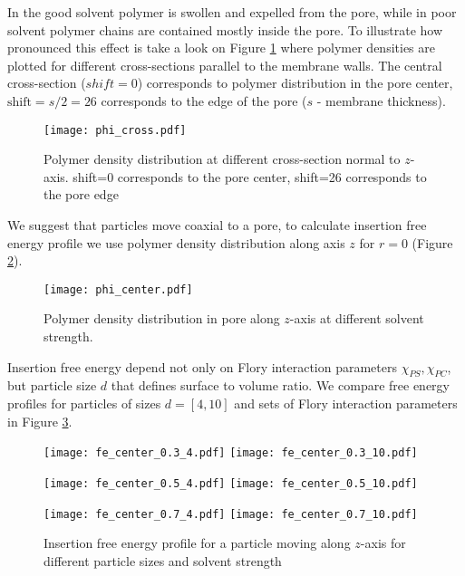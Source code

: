 \documentclass[12pt,a4paper]{article}
\begin{document}
In the good solvent polymer is swollen and expelled from the pore, while in poor solvent polymer chains are contained mostly inside the pore.
To illustrate how pronounced this effect is take a look on Figure \ref{fig:phi_cross} where polymer densities are plotted for different cross-sections parallel to the membrane walls. The central cross-section ($shift=0$) corresponds to polymer distribution in the pore center, $\mathrm{shift}=s/2=26$ corresponds to the edge of the pore ($s$ - membrane thickness). 

\begin{figure}
    \center
    \texttt{[image: phi\_cross.pdf]}
    \caption{Polymer density distribution at different cross-section normal to $z$-axis. 
    shift=0 corresponds to the pore center, shift=26 corresponds to the pore edge}
    \label{fig:phi_cross}
\end{figure}

We suggest that particles move coaxial to a pore, to calculate insertion free energy profile we use polymer density distribution along axis $z$ for $r=0$ (Figure \ref{fig:phi_center}). 

\begin{figure}
    \center
    \texttt{[image: phi\_center.pdf]}
    \caption{Polymer density distribution in pore along $z$-axis at different solvent strength.}
    \label{fig:phi_center}
\end{figure}

Insertion free energy depend not only on Flory interaction parameters $\chi_{PS}, \chi_{PC}$, but particle size $d$ that defines surface to volume ratio. We compare free energy profiles for particles of sizes $d = [4,10]$ and sets of Flory interaction parameters in Figure \ref{fig:fe_center}.

\begin{figure}
    \center
    \hspace*{-0.3in}
    \texttt{[image: fe\_center\_0.3\_4.pdf]}
    \hspace*{-0.6in}
    \texttt{[image: fe\_center\_0.3\_10.pdf]}
    
    \hspace*{-0.3in}
    \texttt{[image: fe\_center\_0.5\_4.pdf]}
    \hspace*{-0.6in}
    \texttt{[image: fe\_center\_0.5\_10.pdf]}
    
    \hspace*{-0.3in}
    \texttt{[image: fe\_center\_0.7\_4.pdf]}
    \hspace*{-0.6in}
    \texttt{[image: fe\_center\_0.7\_10.pdf]}
    \caption{Insertion free energy profile for a particle moving along $z$-axis for different particle sizes and solvent strength}
    \label{fig:fe_center}
\end{figure}
\end{document}

